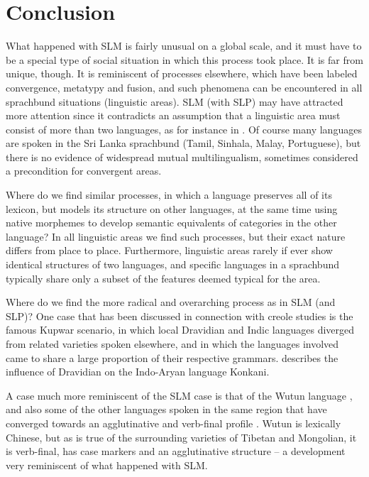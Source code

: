 \section{Conclusion} %
What happened with SLM is fairly unusual on a global scale, and it must have to be a special type of social situation in which this process took place. It is far from unique, though. It is reminiscent of processes elsewhere, which have been labeled convergence, metatypy and fusion, and such phenomena can be encountered in all sprachbund situations (linguistic areas). SLM (with SLP) may have attracted more attention since it contradicts an assumption that a linguistic area must consist of more than two languages, as for instance in \citet{Thomason2000areas}. Of course many languages are spoken in the Sri Lanka sprachbund (Tamil, Sinhala, Malay, Portuguese), but there is no evidence of widespread mutual multilingualism, sometimes considered a precondition for convergent areas.

Where do we find similar processes, in which a language preserves all of its lexicon, but models its structure on other languages, at the same time using native morphemes to develop semantic equivalents of categories in the other language? In all linguistic areas we find such processes, but their exact nature differs from place to place. Furthermore, linguistic areas rarely if ever show identical structures of two languages, and specific languages in a sprachbund typically share only a subset of the features deemed typical for the area.

Where do we find the more radical and overarching process as in SLM (and SLP)? One case that has been discussed in connection with creole studies is the famous Kupwar scenario, in which local Dravidian and Indic languages diverged from related varieties spoken elsewhere, and in which the languages involved came to share a large proportion of their respective grammars. \citet{Nadkarni1975} describes the influence of Dravidian on the Indo-Aryan language Konkani.

A case much more reminiscent of the SLM case is that of the Wutun language \citep{Li1983,Li1984,LeeSmithEtAl1996}, and also some of the other languages spoken in the same region that have converged towards an agglutinative and verb-final profile \citep{Wurm1996northchina}. Wutun is lexically Chinese, but as is true of the surrounding varieties of Tibetan and Mongolian, it is verb-final, has case markers and an agglutinative structure -- a development very reminiscent of what happened with SLM. 

